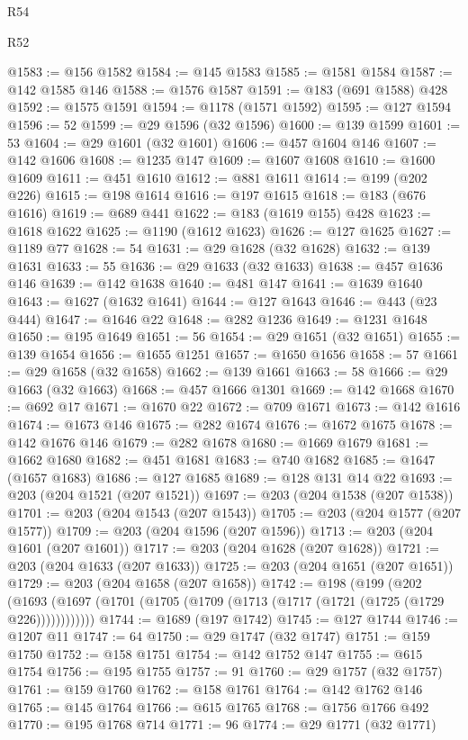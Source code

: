 \begin{lexlean}{R54}
\begin{lexlean}{R52}
\begin{coremodule}
{{{{{{{{{{{{{{{{{{{{{{{{{{{{{{{{{{{{{{{{{{{{{{{{{{{{{{{{{{{{{{{{{{{{{{{{{{{{{{{{{{{{{{{{{{{{{{{{{{{{{{{{{{{{{{{{{{{{{{{{{{{{{{{{{{{{{{{{{{{{{{{{{{{{{{{{{{{{{{{{{{{{{{{{{{{{{{{{{{{{{{{{{{{{{{{{{{{{{{@1583 := @156 @1582
@1584 := @145 @1583
@1585 := @1581 @1584
@1587 := @142 @1585 @146
@1588 := @1576 @1587
@1591 := @183 (@691 @1588) @428
@1592 := @1575 @1591
@1594 := @1178 (@1571 @1592)
@1595 := @127 @1594
@1596 := 52
@1599 := @29 @1596 (@32 @1596)
@1600 := @139 @1599
@1601 := 53
@1604 := @29 @1601 (@32 @1601)
@1606 := @457 @1604 @146
@1607 := @142 @1606
@1608 := @1235 @147
@1609 := @1607 @1608
@1610 := @1600 @1609
@1611 := @451 @1610
@1612 := @881 @1611
@1614 := @199 (@202 @226)
@1615 := @198 @1614
@1616 := @197 @1615
@1618 := @183 (@676 @1616)
@1619 := @689 @441
@1622 := @183 (@1619 @155) @428
@1623 := @1618 @1622
@1625 := @1190 (@1612 @1623)
@1626 := @127 @1625
@1627 := @1189 @77
@1628 := 54
@1631 := @29 @1628 (@32 @1628)
@1632 := @139 @1631
@1633 := 55
@1636 := @29 @1633 (@32 @1633)
@1638 := @457 @1636 @146
@1639 := @142 @1638
@1640 := @481 @147
@1641 := @1639 @1640
@1643 := @1627 (@1632 @1641)
@1644 := @127 @1643
@1646 := @443 (@23 @444)
@1647 := @1646 @22
@1648 := @282 @1236
@1649 := @1231 @1648
@1650 := @195 @1649
@1651 := 56
@1654 := @29 @1651 (@32 @1651)
@1655 := @139 @1654
@1656 := @1655 @1251
@1657 := @1650 @1656
@1658 := 57
@1661 := @29 @1658 (@32 @1658)
@1662 := @139 @1661
@1663 := 58
@1666 := @29 @1663 (@32 @1663)
@1668 := @457 @1666 @1301
@1669 := @142 @1668
@1670 := @692 @17
@1671 := @1670 @22
@1672 := @709 @1671
@1673 := @142 @1616
@1674 := @1673 @146
@1675 := @282 @1674
@1676 := @1672 @1675
@1678 := @142 @1676 @146
@1679 := @282 @1678
@1680 := @1669 @1679
@1681 := @1662 @1680
@1682 := @451 @1681
@1683 := @740 @1682
@1685 := @1647 (@1657 @1683)
@1686 := @127 @1685
@1689 := @128 @131 @14 @22
@1693 := @203 (@204 @1521 (@207 @1521))
@1697 := @203 (@204 @1538 (@207 @1538))
@1701 := @203 (@204 @1543 (@207 @1543))
@1705 := @203 (@204 @1577 (@207 @1577))
@1709 := @203 (@204 @1596 (@207 @1596))
@1713 := @203 (@204 @1601 (@207 @1601))
@1717 := @203 (@204 @1628 (@207 @1628))
@1721 := @203 (@204 @1633 (@207 @1633))
@1725 := @203 (@204 @1651 (@207 @1651))
@1729 := @203 (@204 @1658 (@207 @1658))
@1742 := @198
    (@199
      (@202 (@1693 (@1697 (@1701 (@1705 (@1709 (@1713 (@1717 (@1721 (@1725 (@1729 @226))))))))))))
@1744 := @1689 (@197 @1742)
@1745 := @127 @1744
@1746 := @1207 @11
@1747 := 64
@1750 := @29 @1747 (@32 @1747)
@1751 := @159 @1750
@1752 := @158 @1751
@1754 := @142 @1752 @147
@1755 := @615 @1754
@1756 := @195 @1755
@1757 := 91
@1760 := @29 @1757 (@32 @1757)
@1761 := @159 @1760
@1762 := @158 @1761
@1764 := @142 @1762 @146
@1765 := @145 @1764
@1766 := @615 @1765
@1768 := @1756 @1766 @492
@1770 := @195 @1768 @714
@1771 := 96
@1774 := @29 @1771 (@32 @1771)
}}}}}}}}}}}}}}}}}}}}}}}}}}}}}}}}}}}}}}}}}}}}}}}}}}}}}}}}}}}}}}}}}}}}}}}}}}}}}}}}}}}}}}}}}}}}}}}}}}}}}}}}}}}}}}}}}}}}}}}}}}}}}}}}}}}}}}}}}}}}}}}}}}}}}}}}}}}}}}}}}}}}}}}}}}}}}}}}}}}}}}}}}}}}}}}}}}}}}}
\end{coremodule}
\end{lexlean}
\end{lexlean}
